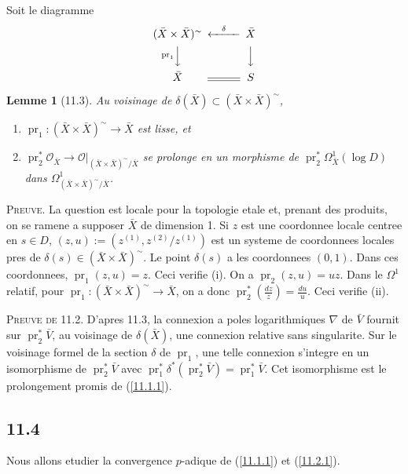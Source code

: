 \documentclass[12pt,a4paper]{article}
\theoremstyle{plain}
\newtheorem{lemma}[theorem]{Lemme}
\theoremstyle{definition}
\theoremstyle{remark}
\DeclareMathOperator{\pr}{pr}
\begin{document}
Soit le diagramme
$$\begin{CD}
(\bar{X} \times \bar{X})^\sim @<{\delta}<< \bar{X} \\
@V{\pr_1}VV @VVV \\
\bar{X} @= S
\end{CD}$$

\begin{lemma}[11.3]
Au voisinage de $\delta(\bar{X}) \subset (\bar{X} \times \bar{X})^\sim$,
\begin{enumerate}[label=(\roman*)]
\item $\pr_1: (\bar{X} \times \bar{X})^\sim \to \bar{X}$ est lisse, et
\item $\pr_2^* \mathcal{O}_{\bar{X}} \to \mathcal{O}|_{(\bar{X} \times \bar{X})^\sim/\bar{X}}$ se prolonge en un morphisme de $\pr_2^* \Omega^1_{\bar{X}}(\log D)$ dans $\Omega^1_{(\bar{X} \times \bar{X})^\sim/\bar{X}}$.
\end{enumerate}
\end{lemma}

\textsc{Preuve.} La question est locale pour la topologie etale et, prenant des produits, on se ramene a supposer $\bar{X}$ de dimension 1. Si $z$ est une coordonnee locale centree en $s \in D$, $(z, u) := (z^{(1)}, z^{(2)}/z^{(1)})$ est un systeme de coordonnees locales pres de $\delta(s) \in (\bar{X} \times \bar{X})^\sim$. Le point $\delta(s)$ a les coordonnees $(0, 1)$. Dans ces coordonnees, $\pr_1(z, u) = z$. Ceci verifie (i). On a $\pr_2(z, u) = uz$. Dans le $\Omega^1$ relatif, pour $\pr_1: (\bar{X} \times \bar{X})^\sim \to \bar{X}$, on a donc $\pr_2^*(\frac{dz}{z}) = \frac{du}{u}$. Ceci verifie (ii).

\textsc{Preuve de 11.2.} D'apres 11.3, la connexion a poles logarithmiques $\nabla$ de $\bar{V}$ fournit sur $\pr_2^* \bar{V}$, au voisinage de $\delta(\bar{X})$, une connexion relative sans singularite. Sur le voisinage formel de la section $\delta$ de $\pr_1$, une telle connexion s'integre en un isomorphisme de $\pr_2^* \bar{V}$ avec $\pr_1^* \delta^*(\pr_2^* \bar{V}) = \pr_1^* \bar{V}$. Cet isomorphisme est le prolongement promis de (\ref{11.1.1}).

\subsection*{11.4}

Nous allons etudier la convergence $p$-adique de (\ref{11.1.1}) et (\ref{11.2.1}).
\end{document}
